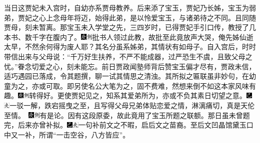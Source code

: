 当日这贾妃未入宫时，自幼亦系贾母教养。后来添了宝玉，贾妃乃长姊，宝玉为弱弟，贾妃之心上念母年将迈，始得此弟，是以怜爱宝玉，与诸弟待之不同。且同随贾母，刻未暂离。那宝玉未入学堂之先，三四岁时，已得贾妃手引口传，教授了几本书、数千字在腹内了。{\includegraphics[width=3mm]{../Images/00004}\includegraphics[width=3mm]{../Images/00011}\footnotesize \kaishu 批书人领过此教，故批至此竟放声大哭，俺先姊仙逝太早，不然余何得为废人耶？}其名分虽系姊弟，其情状有如母子。自入宫后，时时带信出来与父母说：``千万好生扶养，不严不能成器，过严恐生不虞，且致父母之忧。''眷念切爱之心，刻未能忘。前日贾政闻塾师背后赞宝玉偏才尽有，贾政未信，适巧遇园已落成，令其题撰，聊一试其情思之清浊。其所拟之匾联虽非妙句，在幼童为之，亦或可取。即另使名公大笔为之，固不费难，然想来倒不如这本家风味有趣。{\includegraphics[width=3mm]{../Images/00004}\includegraphics[width=3mm]{../Images/00011}\footnotesize \kaishu 转得好。}更使贾妃见之，知系其爱弟所为，亦或不负其素日切望之意。{\includegraphics[width=3mm]{../Images/00003}\includegraphics[width=3mm]{../Images/00012}\footnotesize \kaishu 一驳一解，跌宕摇曳之至，且写得父母兄弟体贴恋爱之情，淋漓痛切，真是天伦至情。　{\includegraphics[width=3mm]{../Images/00004}\includegraphics[width=3mm]{../Images/00011}\footnotesize \kaishu 有是论。}}因有这段原委，故此竟用了宝玉所题之联额。那日虽未曾题完，后来亦曾补拟。{\includegraphics[width=3mm]{../Images/00003}\includegraphics[width=3mm]{../Images/00012}\footnotesize \kaishu 一句补前文之不暇，启后文之苗裔。至后文凹晶馆黛玉口中又一补，所谓``一击空谷，八方皆应''。}

